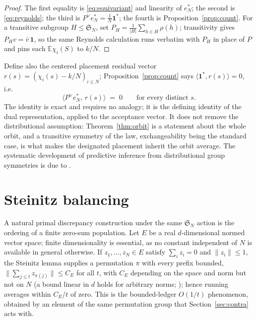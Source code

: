\documentclass[11pt]{article}
\theoremstyle{remark}
\newcommand{\E}{\mathbb{E}}
\begin{document}
\begin{proof}
The first equality is \eqref{eq:equivariant} and linearity of $e^{*}_{N}$; the second is
\eqref{eq:reynolds}; the third is $P^{\vee}e^{*}_{N}=\frac1N\mathbf 1^{*}$; the fourth is
Proposition~\ref{prop:count}. For a transitive subgroup $H\le\mathfrak S_N$, set $P_H=\frac1{|H|}\sum_{h\in H}\rho(h)$;
transitivity gives $P_Hv=\bar v\,\mathbf 1$, so the same Reynolds calculation runs verbatim
with $P_H$ in place of $P$ and pins each $\E\chi_i(S)$ to $k/N$.
\end{proof}

Define also the centered placement residual vector $r(s)=(\chi_i(s)-k/N)_{i\le N}$;
Proposition~\ref{prop:count} says $\langle\mathbf 1^{*},r(s)\rangle=0$, i.e.
\begin{equation}\label{eq:orbitzero}
\langle P^{\vee}e^{*}_{N},\,r(s)\rangle\;=\;0
\qquad\text{for every distinct } s .
\end{equation}
The identity is exact and requires no analogy; it is the defining identity of the dual
representation, applied to the acceptance vector. It does not remove the distributional
assumption: Theorem~\ref{thm:orbit} is a statement about the whole orbit, and a transitive
symmetry of the law, exchangeability being the standard case, is what makes the designated
placement inherit the orbit average. The systematic development of predictive inference from
distributional group symmetries is due to \citet{dobriban2025symmpi}.

\section{Steinitz balancing}\label{sec:steinitz}

A natural primal discrepancy construction under the same $\mathfrak S_{N}$ action is the
ordering of a finite zero-sum population. Let $E$ be a real $d$-dimensional normed vector
space;
finite dimensionality is essential, as no constant independent of $N$ is available in general
otherwise. If $z_1,\dots,z_{N}\in E$ satisfy $\sum_i z_i=0$ and $\|z_i\|\le 1$, the Steinitz
lemma \citep{steinitz1913} supplies a permutation $\pi$ with every prefix bounded,
$\|\sum_{j\le t}z_{\pi(j)}\|\le C_E$ for all $t$, with $C_E$ depending on the space and norm
but not on $N$ (a bound linear in $d$ holds for arbitrary norms; \citealp{grinberg1980}); hence
running averages within $C_E/t$ of zero. This is the bounded-ledger $O(1/t)$ phenomenon,
obtained by an element of the same permutation group that Section~\ref{sec:contra} acts with.
\end{document}
